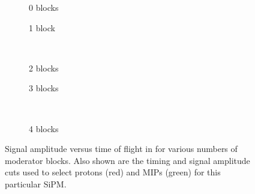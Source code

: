 \begin{figure}[t]
  \begin{subfigure}[t]{.5\textwidth}
    \begin{adjustbox}{max totalsize=\textwidth, center}
      
    \end{adjustbox}
    \caption{0 blocks}
    \label{fig:tvsa:0}
  \end{subfigure}
  \hfill
  \begin{subfigure}[t]{.5\textwidth}
    \begin{adjustbox}{max totalsize=\textwidth, center}
            
    \end{adjustbox}
    \caption{1 block}
  \end{subfigure} \\
  \begin{subfigure}[t]{.5\textwidth}
    \begin{adjustbox}{max totalsize=\textwidth, center}
      
    \end{adjustbox}
    \caption{2 blocks}
  \end{subfigure}
  \hfill
  \begin{subfigure}[t]{.5\textwidth}
    \begin{adjustbox}{max totalsize=\textwidth, center}
      
    \end{adjustbox}
    \caption{3 blocks}
  \end{subfigure} \\

  \begin{subfigure}[t]{\textwidth}
    \begin{adjustbox}{max totalsize=.5\textwidth, center}
      
    \end{adjustbox}
    \caption{4 blocks}
    \label{fig:tvsa:4blocks}
  \end{subfigure}

  \caption[Signal amplitude versus time of flight in \SThree]{Signal amplitude versus time of flight in \SThree for various numbers of moderator blocks. Also shown are the timing and signal amplitude cuts used to select protons (red) and MIPs (green) for this particular SiPM.}
  \label{fig:tvsa}
\end{figure}

